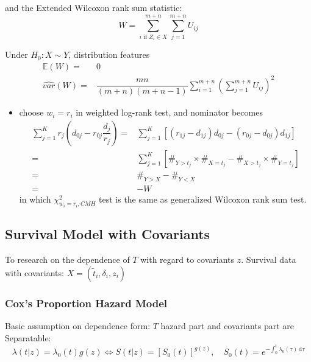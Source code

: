 \begin{itemize}[topsep=2pt,itemsep=0pt]
    and the Extended Wilcoxon rank sum statistic:
    \begin{equation}
         W=\sum_{i\text{ if }Z_i\in X}^{m+n}\sum_{j=1}^{m+n}U_{ij}
    \end{equation}

    Under $ H_0: X\sim Y $, distribution features
    \begin{align}
        \mathbb{E}\left( W \right) =&0\\
        \hat{var}(W)=&\dfrac{mn}{(m+n)(m+n-1)}\sum_{i=1}^{m+n}\left(\sum_{j=1}^{m+n}U_{ij}\right)^2
    \end{align}

    \begin{itemize}[topsep=2pt,itemsep=0pt]
        \item choose $ w_i=r_i $ in weighted log-rank test, and nominator becomes
        \begin{align}
            \sum_{j=1}^Kr_j(d_{0j}-r_{0j}\dfrac{d_j}{r_j})=&\sum_{j=1}^K\left[ (r_{1j}-d_{1j})d_{0j}-(r_{0j}-d_{0j})d_{1j} \right]\\
            =&\sum_{j=1}^K\left[ \#_{Y>t_j}\times \#_{X=t_j}-\#_{X>t_j}\times \#_{Y=t_j}  \right]\\
            =&\#_{Y>X}-\#_{Y<X}\\
            =&-W
        \end{align}
        in which $ \chi^2_{w_i=r_i,CMH} $ test is the same as generalized Wilcoxon rank sum test.
        
        
    \end{itemize}
    
        
\end{itemize}

\subsection{Survival Model with Covariants} 

To research on the dependence of $ T $ with regard to covariants $ z $. Survival data with covariants: $ X=(\tilde{t}_i,\delta _i,z_i) $

\subsubsection{Cox's Proportion Hazard Model}
Basic assumption on dependence form: $ T $ hazard part and covariants part are Separatable:
\begin{equation}
    \lambda (t|z)=\lambda _0(t)g(z)\Leftrightarrow S(t|z)=\left[S_0(t)\right]^{g(z)},\quad S_0(t)=e^{-\int _0^t\lambda _0(\tau) \,\mathrm{d}\tau}
\end{equation}

